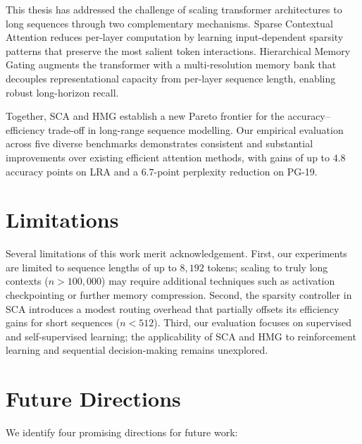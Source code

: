 \documentclass[12pt,a4paper,oneside]{book}
\begin{document}
This thesis has addressed the challenge of scaling transformer architectures to long
sequences through two complementary mechanisms. Sparse Contextual Attention reduces
per-layer computation by learning input-dependent sparsity patterns that preserve the
most salient token interactions. Hierarchical Memory Gating augments the transformer
with a multi-resolution memory bank that decouples representational capacity from
per-layer sequence length, enabling robust long-horizon recall.

Together, SCA and HMG establish a new Pareto frontier for the accuracy--efficiency
trade-off in long-range sequence modelling. Our empirical evaluation across five diverse
benchmarks demonstrates consistent and substantial improvements over existing efficient
attention methods, with gains of up to $4.8$ accuracy points on LRA and a $6.7$-point
perplexity reduction on PG-19.

\section{Limitations}

Several limitations of this work merit acknowledgement. First, our experiments are
limited to sequence lengths of up to $8{,}192$ tokens; scaling to truly long contexts
($n > 100{,}000$) may require additional techniques such as activation checkpointing or
further memory compression. Second, the sparsity controller in SCA introduces a modest
routing overhead that partially offsets its efficiency gains for short sequences
($n < 512$). Third, our evaluation focuses on supervised and self-supervised learning;
the applicability of SCA and HMG to reinforcement learning and sequential
decision-making remains unexplored.

\section{Future Directions}

We identify four promising directions for future work:
\end{document}
